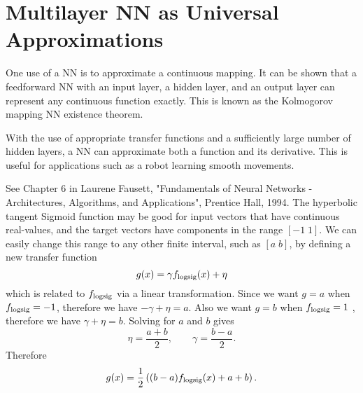 \documentclass[fleqn]{article}
\begin{document}
\section{Multilayer NN as Universal Approximations}

One use of a NN is to approximate a continuous mapping.
It can be shown that a feedforward NN with an input layer, a hidden layer, and an output layer
can represent any continuous function exactly.
This is known as the Kolmogorov mapping NN existence theorem.

With the use of appropriate transfer functions and a sufficiently large number of hidden layers,
a NN can approximate both a function and its derivative.
This is useful for applications such as a robot learning smooth movements.



\pagebreak



\vskip 5pt
\begin{thebibliography}{9}
See Chapter 6 in Laurene Fausett,
"Fundamentals of Neural Networks - Architectures, Algorithms, and Applications",
Prentice Hall, 1994.
The hyperbolic tangent Sigmoid function may be good for input vectors that have continuous real-values,
and the target vectors have components in the range $[-1 \; 1]$.
We can easily change this range to any other finite interval, such as $[a \; b]$,
by defining a new transfer function
\[
g(x) = \gamma f_{\mbox{\scriptsize{logsig}}}(x) + \eta
\]
which is related to $f_{\mbox{\scriptsize{logsig}}}$ via a linear transformation.
Since we want $g =a$ when $f_{\mbox{\scriptsize{logsig}}} = -1$, therefore we have $-\gamma + \eta = a$.
Also we want $g=b$ when $f_{\mbox{\scriptsize{logsig}}} = 1$ , therefore we have
$
\gamma + \eta = b.
$
Solving for $a$ and $b$ gives
\[
\eta = \frac{a+b}{2}, \qquad \gamma = \frac{b-a}{2}.
\]
Therefore
\[
g(x) = \frac{1}{2} \left( (b-a) f_{\mbox{\scriptsize{logsig}}}(x) + a+b \right).
\]
\\
\end{thebibliography}

\end{document}
